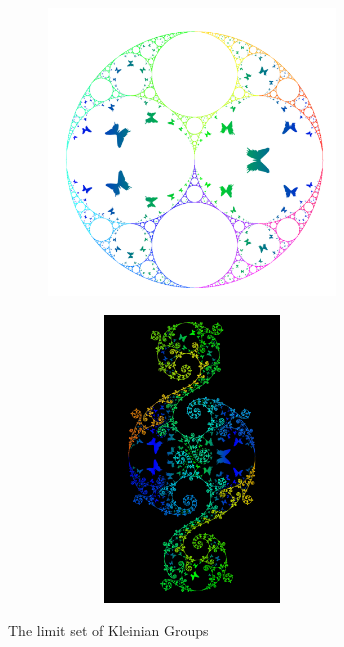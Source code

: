 \begin{figure}[h!tbp]
 \begin{subfigure}{0.49\hsize}
   \begin{center}
    \includegraphics[width=3in, height=3in, keepaspectratio]{../img/klein/apr.pdf}
    \caption{}
    \label{fig:apr}
   \end{center}
 \end{subfigure}
 \hspace*{\fill}
 \begin{subfigure}{0.49\hsize}
   \begin{center}
    \includegraphics[width=3in, height=3in, keepaspectratio]{../img/klein/comp.pdf}
    \caption{}
    \label{fig:comp}
   \end{center}
 \end{subfigure}
 \caption{The limit set of Kleinian Groups}
 \label{fig:limitsetWithOrbit}
\end{figure}

